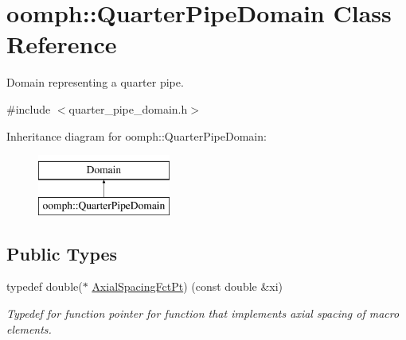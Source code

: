 \hypertarget{classoomph_1_1QuarterPipeDomain}{}\section{oomph\+:\+:Quarter\+Pipe\+Domain Class Reference}
\label{classoomph_1_1QuarterPipeDomain}


Domain representing a quarter pipe.  




{\ttfamily \#include $<$quarter\+\_\+pipe\+\_\+domain.\+h$>$}

Inheritance diagram for oomph\+:\+:Quarter\+Pipe\+Domain\+:\begin{figure}[H]
\begin{center}
\leavevmode
\includegraphics[height=2.000000cm]{classoomph_1_1QuarterPipeDomain}
\end{center}
\end{figure}
\subsection*{Public Types}
\begin{DoxyCompactItemize}
\item 
typedef double($\ast$ \hyperlink{classoomph_1_1QuarterPipeDomain_a540d441b38146aacb12938d5f885789c}{Axial\+Spacing\+Fct\+Pt}) (const double \&xi)
\begin{DoxyCompactList}\small\item\em Typedef for function pointer for function that implements axial spacing of macro elements. \end{DoxyCompactList}\end{DoxyCompactItemize}

